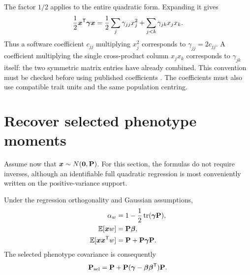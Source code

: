 The factor \(1/2\) applies to the entire quadratic form. Expanding it gives
\begin{equation}
 \frac12\boldsymbol{x}^{\mathsf T}\boldsymbol{\gamma}\boldsymbol{x}
 =\frac12\sum_j\gamma_{jj}x_j^2
   +\sum_{j<k}\gamma_{jk}x_jx_k.
 \label{conversion:coefficient_convention}
\end{equation}
Thus a software coefficient \(c_{jj}\) multiplying \(x_j^2\) corresponds
to \(\gamma_{jj}=2c_{jj}\). A coefficient multiplying the single
cross-product column \(x_jx_k\) corresponds to \(\gamma_{jk}\) itself:
the two symmetric matrix entries have already combined. This convention
must be checked before using published coefficients
\citep{StinchcombeEtAl2008}. The coefficients must also use compatible trait
units and the same population centring.

\section{Recover selected phenotype moments}
\label{conversion:phenotype_moments}

Assume now that \(\boldsymbol{x}\sim N(\boldsymbol{0},\mathbf{P})\). For this section, the
formulas do not require inverses, although an identifiable full quadratic
regression is most conveniently written on the positive-variance support.

\begin{proposition}
\label{conversion:regression_moments}
Under the regression orthogonality and Gaussian assumptions,
\begin{align}
 \alpha_w&=1-\frac12\operatorname{tr}(\boldsymbol{\gamma}\mathbf{P}),\nonumber\\
 \mathbb E[\boldsymbol{x}w]&=\mathbf{P}\boldsymbol{\beta},\nonumber\\
 \mathbb E[\boldsymbol{x}\boldsymbol{x}^{\mathsf T}w]
   &=\mathbf{P}+\mathbf{P}\boldsymbol{\gamma}\mathbf{P}.
 \label{conversion:phenotype_moment_formula}
\end{align}
The selected phenotype covariance is consequently
\begin{equation}
 \mathbf{P}_{\rm sel}
 =\mathbf{P}+\mathbf{P}
       (\boldsymbol{\gamma}-\boldsymbol{\beta}\boldsymbol{\beta}^{\mathsf T})\mathbf{P}.
 \label{conversion:selected_phenotype_covariance}
\end{equation}
\end{proposition}

